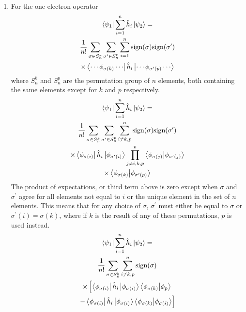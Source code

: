 \documentclass[final,3p,times,twocolumn]{elsarticle}
\begin{document}
\begin{enumerate}
	\item For the one electron operator
	\begin{gather}
	\begin{gathered}
	\bra{\psi_1}\sum_{i=1}^n \hat h_i \ket{\psi_2} = \\ \frac{1}{n!} \sum_{\sigma \in S_n^k}\sum_{\sigma^\prime \in S_n^p}\sum_{i=1}^n \text{sign}(\sigma)\text{sign}(\sigma^\prime) \\
	\times \bra{\cdots\phi_{\sigma(k)}\cdots} \hat h_i \ket{\cdots\phi_{\sigma^\prime(p)}\cdots}
	\end{gathered}
	\end{gather}
	where $S_n^k$ and $S_n^p$ are the permutation group of $n$ elements, both containing the same elements except for $k$ and $p$ respectively.
	\begin{gather}
	\begin{gathered}
	\bra{\psi_1}\sum_{i=1}^n \hat h_i \ket{\psi_2} = \\ \frac{1}{n!} \sum_{\sigma \in S_n^k}\sum_{\sigma^\prime \in S_n^p}\sum_{i\neq k,p}^n \text{sign}(\sigma)\text{sign}(\sigma^\prime) \\
	\times \bra{\phi_{\sigma(i)}}\hat h_i \ket{\phi_{\sigma^\prime(i)}} \prod_{j\neq i, k, p}^n \bra{\phi_{\sigma(j)}}\ket{\phi_{\sigma^\prime(j)}} \\ \times \bra{\phi_{\sigma(k)}}\ket{\phi_{\sigma^\prime(p)}}
	\end{gathered}
	\end{gather}
	The product of expectations, or third term above is zero except when $\sigma$ and $\sigma^\prime$ agree for all elements not equal to $i$ or the unique element in the set of $n$ elements. This means that for any choice of $\sigma$, $\sigma^\prime$ must either be equal to $\sigma$ or $\sigma^\prime(i) = \sigma(k)$, where if $k$ is the result of any of these permutations, $p$ is used instead.
	\begin{gather}
	\begin{gathered}
	\bra{\psi_1}\sum_{i=1}^n \hat h_i \ket{\psi_2} = \\ \frac{1}{n!} \sum_{\sigma \in S_n^k}\sum_{i\neq k,p}^n \text{sign}(\sigma) \\
	\times \left[ \bra{\phi_{\sigma(i)}}\hat h_i \ket{\phi_{\sigma(i)}} \bra{\phi_{\sigma(k)}}\ket{\phi_{p}} \right.
	\\ \left. - \bra{\phi_{\sigma(i)}}\hat h_i \ket{\phi_{\sigma(i)}} \bra{\phi_{\sigma(k)}}\ket{\phi_{\sigma(i)}} \right]
	\end{gathered}
	\end{gather}
	
\end{enumerate}
\end{document}
